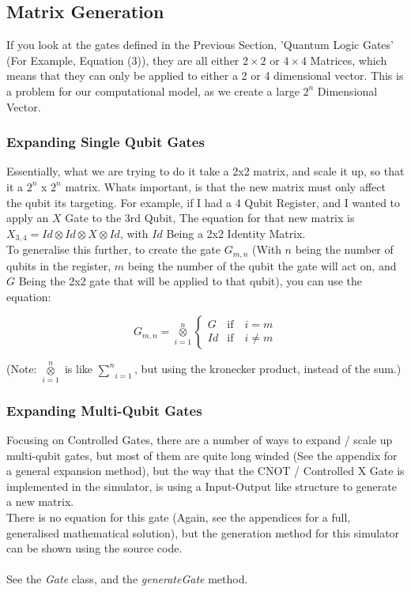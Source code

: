 \documentclass[../main.tex]{subfiles}
\begin{document}
\subsection{Matrix Generation}
If you look at the gates defined in the Previous Section, 'Quantum Logic Gates' (For Example, Equation (3)), they are all either \(2\times2\) or \(4\times4\) Matrices, which means that they can only be applied to either a 2 or 4 dimensional vector. This is a problem for our computational model, as we create a large \(2^n\) Dimensional Vector.

\subsubsection{Expanding Single Qubit Gates}
Essentially, what we are trying to do it take a 2x2 matrix, and scale it up, so that it a \(2^n\) x \(2^n\) matrix. Whats important, is that the new matrix must only affect the qubit its targeting. For example, if I had a 4 Qubit Register, and I wanted to apply an \(X\) Gate to the 3rd Qubit, The equation for that new matrix is \(X_{3,4} = Id \otimes Id \otimes X \otimes Id \), with \(Id\) Being a 2x2 Identity Matrix. \\
To generalise this further, to create the gate \(G_{m,n}\) (With \(n\) being the number of qubits in the register, \(m\) being the number of the qubit the gate will act on, and \(G\) Being the 2x2 gate that will be applied to that qubit), 
you can use the equation:

\begin{equation}
	G_{m,n} = \underset{i=1}{\overset{n}{\otimes}}
	\begin{cases}
    	G & \text{if} \quad i = m \\
    	Id & \text{if} \quad i \neq m
	\end{cases}
\end{equation}

(Note: \(\underset{i=1}{\overset{n}{\otimes}}\) is like \(\underset{i=1}{\overset{n}{\sum}}\), but using the kronecker product, instead of the sum.)

\subsubsection{Expanding Multi-Qubit Gates}
Focusing on Controlled Gates, there are a number of ways to expand / scale up multi-qubit gates, but most of them are quite long winded (See the appendix for a general expansion method),
but the way that the CNOT / Controlled X Gate is implemented in the simulator, is using a Input-Output like structure to generate a new matrix. \\
There is no equation for this gate (Again, see the appendices for a full, generalised mathematical solution), but the generation method for this simulator can be shown using the source code. \\ \\ 
See the \emph{Gate} class, and the \emph{generateGate} method.
\end{document}
